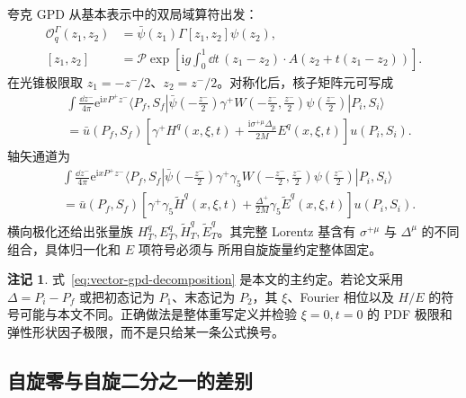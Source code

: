 \documentclass[12pt,a4paper]{ctexart}
\theoremstyle{definition}
\newtheorem{remark}{注记}[section]
\newcommand{\ii}{\mathrm{i}}
\newcommand{\ee}{\mathrm{e}}
\begin{document}
夸克 GPD 从基本表示中的双局域算符出发：
\begin{equation}
\begin{aligned}
\mathcal O_q^{\Gamma}(z_1,z_2)
&=\bar\psi(z_1)\Gamma[z_1,z_2]\psi(z_2),\\
[z_1,z_2]&=\mathcal P\exp\!\left[
\ii g\int_0^1\dd t\,(z_1-z_2)\cdot A(z_2+t(z_1-z_2))
\right].
\end{aligned}
\label{eq:quark-bilocal}
\end{equation}
在光锥极限取 $z_1=-z^-/2$、$z_2=z^-/2$。对称化后，核子矩阵元可写成
\begin{equation}
\begin{aligned}
&\int\frac{\dd z^-}{4\pi}\ee^{\ii xP^+z^-}
\langle P_f,S_f|
\bar\psi\!\left(-\frac{z^-}{2}\right)\gamma^+
W\!\left(-\frac{z^-}{2},\frac{z^-}{2}\right)
\psi\!\left(\frac{z^-}{2}\right)
|P_i,S_i\rangle \\
&=\bar u(P_f,S_f)\left[
\gamma^+H^q(x,\xi,t)
+\frac{\ii\sigma^{+\mu}\Delta_\mu}{2M}E^q(x,\xi,t)
\right]u(P_i,S_i).
\end{aligned}
\label{eq:vector-gpd-decomposition}
\end{equation}
轴矢通道为
\begin{equation}
\begin{aligned}
&\int\frac{\dd z^-}{4\pi}\ee^{\ii xP^+z^-}
\langle P_f,S_f|
\bar\psi\!\left(-\frac{z^-}{2}\right)\gamma^+\gamma_5
W\!\left(-\frac{z^-}{2},\frac{z^-}{2}\right)
\psi\!\left(\frac{z^-}{2}\right)
|P_i,S_i\rangle \\
&=\bar u(P_f,S_f)\left[
\gamma^+\gamma_5\widetilde H^q(x,\xi,t)
+\frac{\Delta^+}{2M}\gamma_5\widetilde E^q(x,\xi,t)
\right]u(P_i,S_i).
\end{aligned}
\label{eq:axial-gpd-decomposition}
\end{equation}
横向极化还给出张量族
$H_T^q,E_T^q,\widetilde H_T^q,\widetilde E_T^q$。其完整 Lorentz 基含有
$\sigma^{+\mu}$ 与 $\Delta^\mu$ 的不同组合，具体归一化和 $E$ 项符号必须与
所用自旋旋量约定整体固定。

\begin{remark}
式~\eqref{eq:vector-gpd-decomposition} 是本文的主约定。若论文采用
$\Delta=P_i-P_f$ 或把初态记为 $P_1$、末态记为 $P_2$，其 $\xi$、Fourier
相位以及 $H/E$ 的符号可能与本文不同。正确做法是整体重写定义并检验
$\xi=0,t=0$ 的 PDF 极限和弹性形状因子极限，而不是只给某一条公式换号。
\end{remark}

\subsection{自旋零与自旋二分之一的差别}
\end{document}
